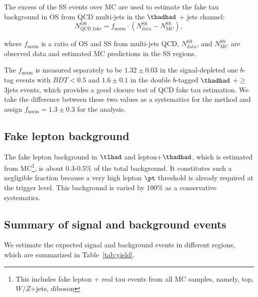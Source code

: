 

The excess of the SS events over MC are used to estimate the fake tau background in OS from QCD multi-jets in the $\thadhad$ + jets channel:   
\begin{equation}
N_{\text{QCD fake}}^{\text{OS}} =f_{\text{norm}}\cdot (N_{\text{data}}^{\text{SS}} - N_{\text{MC}}^{\text{SS}}),
\label{eq:eq10}
\end{equation}

where $f_{\text{norm}}$ is a ratio of OS and SS from multi-jets QCD, 
$N_{\text{data}}^{\text{SS}}$, and $N_{\text{MC}}^{\text{SS}}$ are observed data and estimated MC predictions in the SS regions. 

The $f_{\text{norm}}$ is measured separately to be $1.32\pm 0.03$ in the signal-depleted
one $b$-tag events with $BDT<0.5$ and $1.6\pm 0.1$ in the double $b$-tagged  $\thadhad$ +$\ge$ 3jets events,
 which provides a good closure test of QCD fake tau estimation. We take the difference between these
two values as a systematics for the method and assign $f_{\text{norm}}=1.3\pm 0.3$ for the analysis.

\subsection{Fake lepton background}
\label{sec:fcnc_fakeLep_bkg}

The fake lepton background in $\tlhad$ and lepton+$\thadhad$, which is estimated from MC\footnote{This includes fake lepton + real tau events
from all MC samples, namely, top, $W/Z$+jets, diboson}, is about $0.3$-$0.5\%$ of the total background. It constitutes
such a negligible fraction because a very high lepton $\pt$ threshold is already required at the trigger level. This
background is varied by $100\%$ as a conservative systematics.

\subsection{Summary of signal and background events}
\label{sec:background_hadhad}

We estimate the expected signal and background events in different regions, which are summarized in Table~\ref{tab:yield}. 


